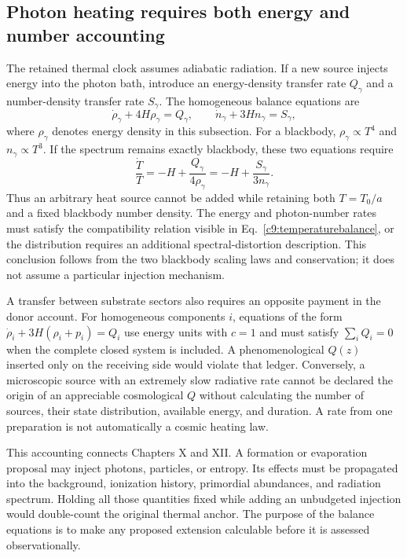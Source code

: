 \subsection{Photon heating requires both energy and number accounting}

The retained thermal clock assumes adiabatic radiation. If a new source injects energy into the photon bath, introduce an energy-density transfer rate $Q_\gamma$ and a number-density transfer rate $S_\gamma$. The homogeneous balance equations are
\begin{equation}
 \dot\rho_\gamma+4H\rho_\gamma=Q_\gamma,\qquad
 \dot n_\gamma+3Hn_\gamma=S_\gamma,
 \label{c9:photonbalances}
\end{equation}
where $\rho_\gamma$ denotes energy density in this subsection. For a blackbody, $\rho_\gamma\propto T^4$ and $n_\gamma\propto T^3$. If the spectrum remains exactly blackbody, these two equations require
\begin{equation}
 \frac{\dot T}{T}=-H+\frac{Q_\gamma}{4\rho_\gamma}
 =-H+\frac{S_\gamma}{3n_\gamma}.
 \label{c9:temperaturebalance}
\end{equation}
Thus an arbitrary heat source cannot be added while retaining both $T=T_0/a$ and a fixed blackbody number density. The energy and photon-number rates must satisfy the compatibility relation visible in Eq.~\eqref{c9:temperaturebalance}, or the distribution requires an additional spectral-distortion description. This conclusion follows from the two blackbody scaling laws and conservation; it does not assume a particular injection mechanism.

A transfer between substrate sectors also requires an opposite payment in the donor account. For homogeneous components $i$, equations of the form $\dot\rho_i+3H(\rho_i+p_i)=Q_i$ use energy units with $c=1$ and must satisfy $\sum_iQ_i=0$ when the complete closed system is included. A phenomenological $Q(z)$ inserted only on the receiving side would violate that ledger. Conversely, a microscopic source with an extremely slow radiative rate cannot be declared the origin of an appreciable cosmological $Q$ without calculating the number of sources, their state distribution, available energy, and duration. A rate from one preparation is not automatically a cosmic heating law.

This accounting connects Chapters X and XII. A formation or evaporation proposal may inject photons, particles, or entropy. Its effects must be propagated into the background, ionization history, primordial abundances, and radiation spectrum. Holding all those quantities fixed while adding an unbudgeted injection would double-count the original thermal anchor. The purpose of the balance equations is to make any proposed extension calculable before it is assessed observationally.

